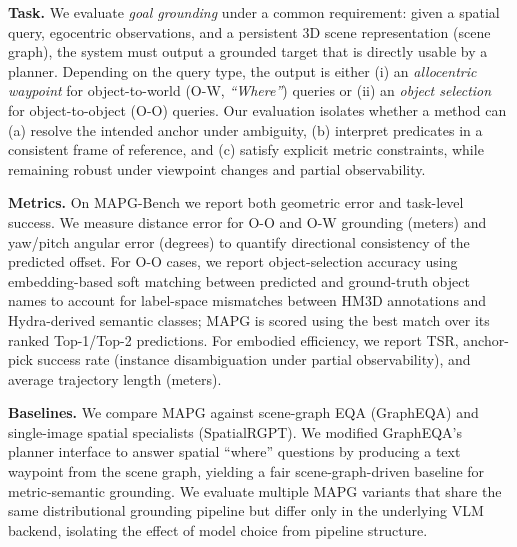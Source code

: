 \textbf{Task.} We evaluate \emph{goal grounding} under a common requirement: given a spatial query, egocentric observations, and a persistent $3$D scene representation (scene graph), the system must output a grounded target that is directly usable by a planner. Depending on the query type, the output is either (i) an \emph{allocentric waypoint} for object-to-world (O-W, \emph{``Where''}) queries or (ii) an \emph{object selection} for object-to-object (O-O) queries. %
Our evaluation isolates whether a method can (a) resolve the intended anchor under ambiguity, (b) interpret predicates in a consistent frame of reference, and (c) satisfy explicit metric constraints, while remaining robust under viewpoint changes and partial observability. 



\textbf{Metrics.} On MAPG-Bench we report both geometric error and task-level success. We measure distance error for O-O and O-W grounding (meters) and yaw/pitch angular error (degrees) to quantify directional consistency of the predicted offset. For O-O cases, we report object-selection accuracy using embedding-based soft matching between predicted and ground-truth object names to account for label-space mismatches between HM$3$D annotations and Hydra-derived semantic classes; MAPG is scored using the best match over its ranked Top-1/Top-2 predictions. For embodied efficiency, we report TSR, anchor-pick success rate (instance disambiguation under partial observability), and average trajectory length (meters).

\textbf{Baselines.} We compare MAPG against scene-graph EQA (GraphEQA) and single-image spatial specialists (SpatialRGPT). We modified GraphEQA's planner interface to answer spatial ``where'' questions by producing a text waypoint from the scene graph, yielding a fair scene-graph-driven baseline for metric-semantic grounding. We evaluate multiple MAPG variants that share the same distributional grounding pipeline but differ only in the underlying VLM backend, isolating the effect of model choice from pipeline structure.

